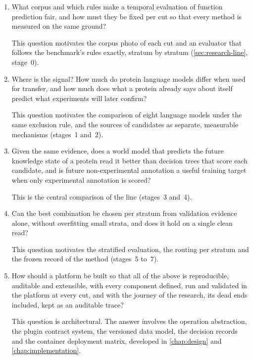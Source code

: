 \begin{enumerate}[label=\textbf{RQ\arabic*.}]
  \item What corpus and which rules make a temporal evaluation of function prediction
        fair, and how must they be fixed per cut so that every method is measured on
        the same ground?

        This question motivates the corpus photo of each cut and an evaluator that
        follows the benchmark's rules exactly, stratum by stratum
        (\cref{sec:research-line}, stage~0).

  \item Where is the signal? How much do protein language models differ when used for
        transfer, and how much does what a protein already says about itself predict
        what experiments will later confirm?

        This question motivates the comparison of eight language models under the
        same exclusion rule, and the sources of candidates as separate, measurable
        mechanisms (stages~1 and~2).

  \item Given the same evidence, does a world model that predicts the future knowledge
        state of a protein read it better than decision trees that score each
        candidate, and is future non-experimental annotation a useful training target
        when only experimental annotation is scored?

        This is the central comparison of the line (stages~3 and~4).

  \item Can the best combination be chosen per stratum from validation evidence alone,
        without overfitting small strata, and does it hold on a single clean read?

        This question motivates the stratified evaluation, the routing per stratum
        and the frozen record of the method (stages~5 to~7).

  \item How should a platform be built so that all of the above is reproducible,
        auditable and extensible, with every component defined, run and validated in
        the platform at every cut, and with the journey of the research, its dead ends
        included, kept as an auditable trace?

        This question is architectural. The answer involves the operation abstraction,
        the plugin contract system, the versioned data model, the decision records and
        the container deployment matrix, developed in \cref{chap:design} and
        \cref{chap:implementation}.
\end{enumerate}

